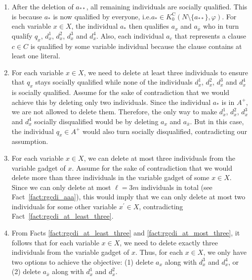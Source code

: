 \documentclass[
    12pt,               %
    a4paper,            %
    bibtotoc,           %
    pointlessnumbers,   %
    ngerman,            %
    titlepage,          %
    leqno,              %
    ]{scrarticle}       %
\newcommand\factref{Fact~\ref}
\begin{document}
\begin{Proof}
\begin{enumerate}[
    topsep=-4pt,
    leftmargin=*,
    itemindent=4.4em,
    label={\textit{Fact \ref*{thm:csr_rgcdi_npc}.\arabic*}:},
    ref={\ref*{thm:csr_rgcdi_npc}.\arabic*}
]
\item \label{fact:rgcdi_deleting_aaa}
After the deletion of $a_{\ast\ast}$, all remaining individuals are socially qualified. This is because $a_\ast$ is now qualified by everyone, i.e.\@ $a_\ast \in K^{\text{C}}_0(N \setminus \{a_{\ast\ast}\}, \varphi)$. For each variable $x \in X$, the individual $a_\ast$ then qualifies $a_x$ and $a_{\bar{x}}$ who in turn qualify $q_x$, $d_x^1$, $d_x^2$, $d_x^3$ and $d_x^4$. Also, each individual $a_c$ that represents a clause $c \in C$ is qualified by some variable individual because the clause contains at least one literal.

\item \label{fact:rgcdi_at_least_three}
For each variable $x \in X$, we need to delete at least three individuals to ensure that $q_x$ stays socially qualified while none of the individuals $d_x^1$, $d_x^2$, $d_x^3$ and $d_x^4$ is socially qualified. Assume for the sake of contradiction that we would achieve this by deleting only two individuals. Since the individual $a_\ast$ is in $A^+$, we are not allowed to delete them. Therefore, the only way to make $d_x^1$, $d_x^2$, $d_x^3$ and $d_x^4$ socially disqualified would be by deleting $a_x$ and $a_{\bar{x}}$. But in this case, the individual $q_x \in A^+$ would also turn socially disqualified, contradicting our assumption.

\item \label{fact:rgcdi_at_most_three}
For each variable $x \in X$, we can delete at most three individuals from the variable gadget of $x$. Assume for the sake of contradiction that we would delete more than three individuals in the variable gadget of some $x \in X$. Since we can only delete at most $\ell = 3m$ individuals in total (see \factref{fact:rgcdi_aaa}), this would imply that we can only delete at most two individuals for some other variable $x^\prime \in X$, contradicting \factref{fact:rgcdi_at_least_three}.

\item \label{fact:rgcdi_exactly_three}
From Facts \ref{fact:rgcdi_at_least_three} and \ref{fact:rgcdi_at_most_three}, it follows that for each variable $x \in X$, we need to delete exactly three individuals from the variable gadget of $x$. Thus, for each $x \in X$, we only have two options to achieve the objective: (1) delete $a_x$ along with $d_x^3$ and $d_x^4$, or (2) delete $a_{\bar{x}}$ along with $d_x^1$ and $d_x^2$.
\end{enumerate}




\end{Proof}
\end{document}
